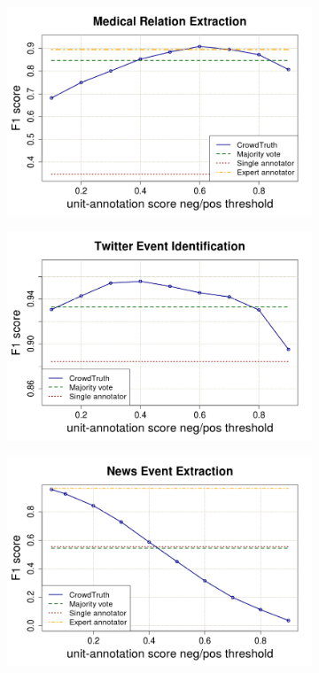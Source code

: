 \begin{figure}[!b]
\centering
\begin{subfigure}{.5\textwidth}
\includegraphics[width=\linewidth]{img/medical_mv.png}
\end{subfigure}%
\begin{subfigure}{.5\textwidth}
\includegraphics[width=\linewidth]{img/tweets_mv_2.png}
\end{subfigure}
\begin{subfigure}{.5\textwidth}
\includegraphics[width=\linewidth]{img/events_mv.png}

\end{subfigure}
\end{figure}
